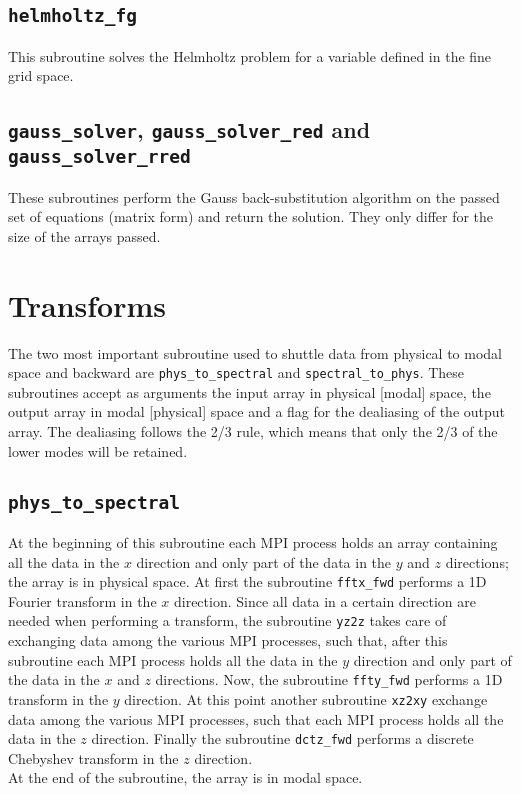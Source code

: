 \subsection{\texttt{helmholtz\_fg}}
This subroutine solves the Helmholtz problem for a variable defined in the fine grid space.

\subsection{\texttt{gauss\_solver}, \texttt{gauss\_solver\_red} and \texttt{gauss\_solver\_rred}}
These subroutines perform the Gauss back-substitution algorithm on the passed set of equations (matrix form) and return the solution. They only differ for the size of the arrays passed.

\section{Transforms}
The two most important subroutine used to shuttle data from physical to modal space and backward are \texttt{phys\_to\_spectral} and \texttt{spectral\_to\_phys}. These subroutines accept as arguments the input array in physical [modal] space, the output array in modal [physical] space and a flag for the dealiasing of the output array. The dealiasing follows the 2/3 rule, which means that only the 2/3 of the lower modes will be retained.

\subsection{\texttt{phys\_to\_spectral}}
At the beginning of this subroutine each MPI process holds an array containing all the data in the $x$ direction and only part of the data in the $y$ and $z$ directions; the array is in physical space. At first the subroutine \texttt{fftx\_fwd} performs a 1D Fourier transform in the $x$ direction. Since all data in a certain direction are needed when performing a transform, the subroutine \texttt{yz2z} takes care of exchanging data among the various MPI processes, such that, after this subroutine each MPI process holds all the data in the $y$ direction and only part of the data in the $x$ and $z$ directions. Now, the subroutine \texttt{ffty\_fwd} performs a 1D transform in the $y$ direction. At this point another subroutine \texttt{xz2xy} exchange data among the various MPI processes, such that each MPI process holds all the data in the $z$ direction. Finally the subroutine \texttt{dctz\_fwd} performs a discrete Chebyshev transform in the $z$ direction.\\
At the end of the subroutine, the array is in modal space.


